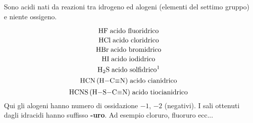 Sono acidi nati da reazioni tra idrogeno ed alogeni (elementi del settimo gruppo) e niente ossigeno.

$$\ce{HF} \; \text{acido fluoridrico}$$
$$\ce{HCl} \; \text{acido cloridrico}$$
$$\ce{HBr} \; \text{acido bromidrico}$$
$$\ce{HI} \; \text{acido iodidrico}$$
$$\ce{H_2S} \; \text{acido solfidrico\footnotemark}$$
$$\ce{HCN (H-C#N)} \; \text{acido cianidrico}$$
$$\ce{HCNS (H-S-C#N)} \; \text{acido tiocianidrico}$$
Qui gli alogeni hanno numero di ossidazione $-1$, $-2$ (negativi). I sali ottenuti dagli idracidi hanno suffisso \textbf{-uro}. Ad esempio cloruro, fluoruro ecc...

